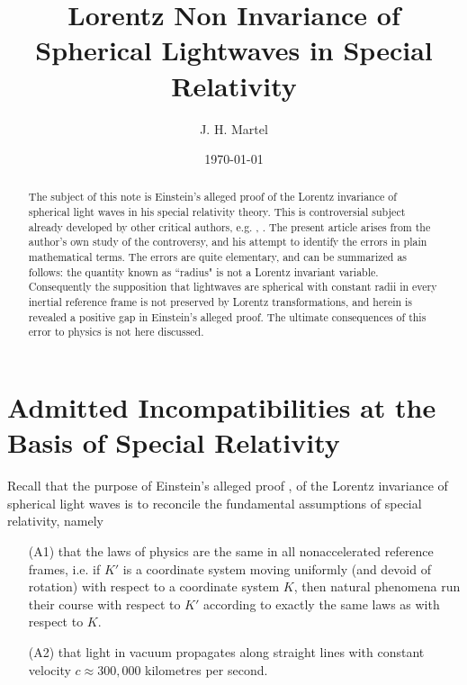 \documentclass[12pt]{amsart}
\theoremstyle{definition}
\theoremstyle{remark}
\begin{document}
\title{Lorentz Non Invariance of Spherical Lightwaves in Special Relativity}


\author{J. H. Martel}
\date{\today}
\maketitle

\begin{abstract}
The subject of this note is Einstein's alleged proof of the Lorentz invariance of spherical light waves in his special relativity theory. This is controversial subject already developed by other critical authors, e.g. \cite{bryant}, \cite{crothers}. The present article arises from the author's own study of the controversy, and his attempt to identify the errors in plain mathematical terms. The errors are quite elementary, and can be summarized as follows: the quantity known as ``radius" is not a Lorentz invariant variable. Consequently the supposition that lightwaves are spherical with constant radii in every inertial reference frame is not preserved by Lorentz transformations, and herein is revealed a positive gap in Einstein's alleged proof. The ultimate consequences of this error to physics is not here discussed.

\end{abstract}

\tableofcontents

\section{Admitted Incompatibilities at the Basis of Special Relativity}




Recall that the purpose of Einstein's alleged proof \cite{einstein2019relativity}, \cite{einstein1905electrodynamics} of the Lorentz invariance of spherical light waves is to reconcile the fundamental assumptions of special relativity, namely
\begin{itemize}

\item[(A1)] that the laws of physics are the same in all nonaccelerated reference frames, i.e. if $K'$ is a coordinate system moving uniformly (and devoid of rotation) with respect to a coordinate system $K$, then natural phenomena run their course with respect to $K'$ according to exactly the same laws as with respect to $K$. 

\item[(A2)] that light in vacuum propagates along straight lines with constant velocity $c\approx 300,000$ kilometres per second.

\end{itemize}
\end{document}
